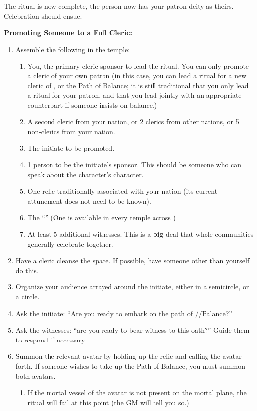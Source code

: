 \documentclass[green]{GL2020}
\begin{document}
The ritual is now complete, the person now has your patron deity as theirs. Celebration should ensue.
   
\textbf{Promoting Someone to a Full Cleric:}
  \begin{enumerate}
    \item Assemble the following in the temple:
    \begin{enumerate}
      \item You, the primary cleric sponsor to lead the ritual. You can only promote a cleric of your own patron (in this case, you can lead a ritual for a new cleric of \cEbb{}, \cFlow{} or the Path of Balance; it is still traditional that you only lead a ritual for your patron, and that you lead jointly with an appropriate counterpart if someone insists on balance.)
      \item A second cleric from your nation, or  2 clerics from other nations, or 5 non-clerics from your nation.
      \item The initiate to be promoted.
      \item 1 person to be the initiate’s sponsor. This should be someone who can speak about the character’s character.
      \item One relic traditionally associated with your nation (its current attunement does not need to be known).
      \item The ``\iOakStaff{}'' (One is available in every temple across \pEarth{})
      \item At least 5 additional witnesses. This is a \textbf{big} deal that whole communities generally celebrate together.
    \end{enumerate}
    \item Have a cleric cleanse the space. If possible, have someone other than yourself do this.
    \item Organize your audience arrayed around the initiate, either in a semicircle, or a circle.
    \item Ask the initiate: ``Are you ready to embark on the path of \cEbb{} /\cFlow{}/Balance?''
    \item Ask the witnesses: ``are you ready to bear witness to this oath?'' Guide them to respond if necessary.
    \item Summon the relevant avatar by holding up the relic and calling the avatar forth. If someone wishes to take up the Path of Balance, you must summon both avatars.
    \begin{enumerate}
      \item If the mortal vessel of the avatar is not present on the mortal plane, the ritual will fail at this point (the GM will tell you so.)

\end{enumerate}
\end{enumerate}
\end{document}

